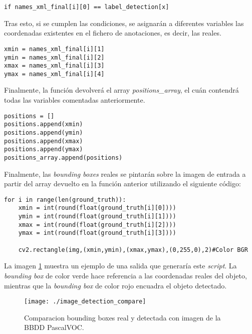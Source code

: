 \documentclass[a4paper, 12pt, oneside]{book}
\begin{document}
\begin{lstlisting}[frame=single]
if names_xml_final[i][0] == label_detection[x]
\end{lstlisting}

Tras esto, si se cumplen las condiciones, se asignarán a diferentes variables las coordenadas existentes en el fichero de anotaciones, es decir, las reales.\\

\begin{lstlisting}[frame=single]
xmin = names_xml_final[i][1]
ymin = names_xml_final[i][2]
xmax = names_xml_final[i][3]
ymax = names_xml_final[i][4]
\end{lstlisting}

Finalmente, la función devolverá el array \textit{positions\_array}, el cuán contendrá todas las variables comentadas anteriormente.\\

\begin{lstlisting}[frame=single]
positions = []
positions.append(xmin)
positions.append(ymin)
positions.append(xmax)
positions.append(ymax)
positions_array.append(positions)
\end{lstlisting}

Finalmente, las \textit{bounding boxes} reales se pintarán sobre la imagen de entrada a partir del array devuelto en la función anterior utilizando el siguiente código:\\

\begin{lstlisting}[frame=single]
for i in range(len(ground_truth)):
	xmin = int(round(float(ground_truth[i][0])))
	ymin = int(round(float(ground_truth[i][1])))
	xmax = int(round(float(ground_truth[i][2])))
	ymax = int(round(float(ground_truth[i][3])))

	cv2.rectangle(img,(xmin,ymin),(xmax,ymax),(0,255,0),2)#Color BGR
\end{lstlisting}

La imagen \ref{DetectionCompare} muestra un ejemplo de una salida que generaría este \textit{script}. La \textit{bounding box} de color verde hace referencia a las coordenadas reales del objeto, mientras que la \textit{bounding box} de color rojo encuadra el objeto detectado.\\

\begin{figure}[H]
\begin{center}
\texttt{[image: ./image\_detection\_compare]}
\caption{Comparacion bounding boxes real y detectada con imagen de la BBDD PascalVOC.}
\label{DetectionCompare}
\end{center}
\end{figure}
\end{document}
